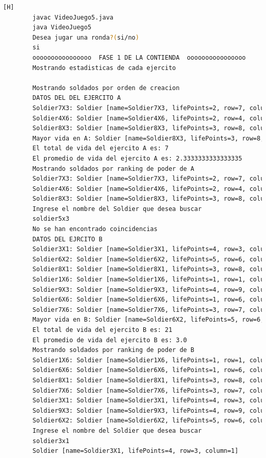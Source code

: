 \documentclass{article}
\begin{document}
	\begin{lstlisting}[language=bash,caption={Compilando y probando el codigo }][H]
		javac VideoJuego5.java
		java VideoJuego5
		Desea jugar una ronda?(si/no)
		si
		oooooooooooooooo  FASE 1 DE LA CONTIENDA  oooooooooooooooo
		Mostrando estadisticas de cada ejercito
		
		Mostrando soldados por orden de creacion
		DATOS DEL DEL EJERCITO A
		Soldier7X3: Soldier [name=Soldier7X3, lifePoints=2, row=7, column=3]
		Soldier4X6: Soldier [name=Soldier4X6, lifePoints=2, row=4, column=6]
		Soldier8X3: Soldier [name=Soldier8X3, lifePoints=3, row=8, column=3]
		Mayor vida en A: Soldier [name=Soldier8X3, lifePoints=3, row=8, column=3]
		El total de vida del ejercito A es: 7
		El promedio de vida del ejercito A es: 2.3333333333333335
		Mostrando soldados por ranking de poder de A
		Soldier7X3: Soldier [name=Soldier7X3, lifePoints=2, row=7, column=3]
		Soldier4X6: Soldier [name=Soldier4X6, lifePoints=2, row=4, column=6]
		Soldier8X3: Soldier [name=Soldier8X3, lifePoints=3, row=8, column=3]
		Ingrese el nombre del Soldier que desea buscar
		soldier5x3
		No se han encontrado coincidencias
		DATOS DEL EJRCITO B
		Soldier3X1: Soldier [name=Soldier3X1, lifePoints=4, row=3, column=1]
		Soldier6X2: Soldier [name=Soldier6X2, lifePoints=5, row=6, column=2]
		Soldier8X1: Soldier [name=Soldier8X1, lifePoints=3, row=8, column=1]
		Soldier1X6: Soldier [name=Soldier1X6, lifePoints=1, row=1, column=6]
		Soldier9X3: Soldier [name=Soldier9X3, lifePoints=4, row=9, column=3]
		Soldier6X6: Soldier [name=Soldier6X6, lifePoints=1, row=6, column=6]
		Soldier7X6: Soldier [name=Soldier7X6, lifePoints=3, row=7, column=6]
		Mayor vida en B: Soldier [name=Soldier6X2, lifePoints=5, row=6, column=2]
		El total de vida del ejercito B es: 21
		El promedio de vida del ejercito B es: 3.0
		Mostrando soldados por ranking de poder de B
		Soldier1X6: Soldier [name=Soldier1X6, lifePoints=1, row=1, column=6]
		Soldier6X6: Soldier [name=Soldier6X6, lifePoints=1, row=6, column=6]
		Soldier8X1: Soldier [name=Soldier8X1, lifePoints=3, row=8, column=1]
		Soldier7X6: Soldier [name=Soldier7X6, lifePoints=3, row=7, column=6]
		Soldier3X1: Soldier [name=Soldier3X1, lifePoints=4, row=3, column=1]
		Soldier9X3: Soldier [name=Soldier9X3, lifePoints=4, row=9, column=3]
		Soldier6X2: Soldier [name=Soldier6X2, lifePoints=5, row=6, column=2]
		Ingrese el nombre del Soldier que desea buscar
		soldier3x1
		Soldier [name=Soldier3X1, lifePoints=4, row=3, column=1]
		

\end{lstlisting}
\end{document}
